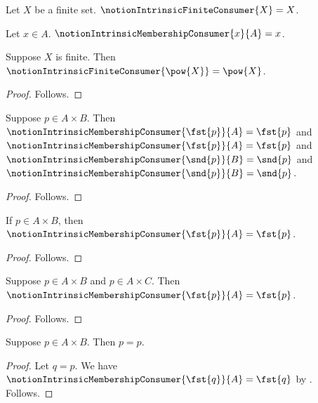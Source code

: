 


\begin{definition}\label{notion_intrinsic_finite_consumer}
    Let $X$ be a finite set.
    $\notionIntrinsicFiniteConsumer{X}=X$.
\end{definition}

\begin{definition}\label{notion_intrinsic_membership_consumer}
    Let $x\in A$.
    $\notionIntrinsicMembershipConsumer{x}{A}=x$.
\end{definition}

\begin{proposition}\label{notion_intrinsic_powerset_result}
    Suppose $X$ is finite.
    Then $\notionIntrinsicFiniteConsumer{\pow{X}}=\pow{X}$.
\end{proposition}
\begin{proof}
    Follows.
\end{proof}

\begin{proposition}\label{notion_intrinsic_projection_result}
    Suppose $p\in A\times B$.
    Then $\notionIntrinsicMembershipConsumer{\fst{p}}{A}=\fst{p}$ and
    $\notionIntrinsicMembershipConsumer{\fst{p}}{A}=\fst{p}$ and
    $\notionIntrinsicMembershipConsumer{\snd{p}}{B}=\snd{p}$ and
    $\notionIntrinsicMembershipConsumer{\snd{p}}{B}=\snd{p}$.
\end{proposition}
\begin{proof}
    Follows.
\end{proof}

\begin{proposition}\label{notion_intrinsic_projection_guard}
    If $p\in A\times B$, then
    $\notionIntrinsicMembershipConsumer{\fst{p}}{A}=\fst{p}$.
\end{proposition}
\begin{proof}
    Follows.
\end{proof}

\begin{proposition}\label{notion_intrinsic_projection_multiple_rows}
    Suppose $p\in A\times B$ and $p\in A\times C$.
    Then $\notionIntrinsicMembershipConsumer{\fst{p}}{A}=\fst{p}$.
\end{proposition}
\begin{proof}
    Follows.
\end{proof}

\begin{proposition}\label{notion_intrinsic_first_projection_core_coordinates}
    Suppose $p\in A\times B$.
    Then $p=p$.
\end{proposition}
\begin{proof}
    Let $q=p$.
    We have $\notionIntrinsicMembershipConsumer{\fst{q}}{A}=\fst{q}$
        by .
    Follows.
\end{proof}

